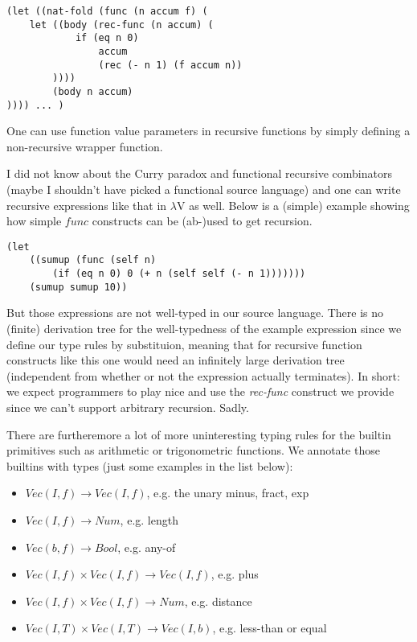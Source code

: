 \documentclass[letterpaper,12pt]{article}
\begin{document}
\begin{lstlisting}
(let ((nat-fold (func (n accum f) (
	let ((body (rec-func (n accum) (
			if (eq n 0)
				accum
				(rec (- n 1) (f accum n))
		))))
		(body n accum)
)))) ... )
\end{lstlisting}

One can use function value parameters in recursive functions
by simply defining a non-recursive wrapper function.

I did not know about the Curry paradox and functional
recursive combinators (maybe I shouldn't have picked a functional source language)
and one can write recursive expressions like that in $\lambda$V as well.
Below is a (simple) example showing how simple $func$ constructs can
be (ab-)used to get recursion.

\begin{lstlisting}
(let 
	((sumup (func (self n) 
		(if (eq n 0) 0 (+ n (self self (- n 1)))))))
	(sumup sumup 10))
\end{lstlisting}

But those expressions are not well-typed in our source language.
There is no (finite) derivation tree
for the well-typedness of the example expression since we define our
type rules by substituion, meaning that for recursive function constructs
like this one would need an infinitely large derivation tree (independent
from whether or not the expression actually terminates).
In short: we expect programmers to play nice and use the \textit{rec-func}
construct we provide since we can't support arbitrary recursion. Sadly.

\medskip
There are furtheremore a lot of more uninteresting typing rules for
the builtin primitives such as arithmetic or trigonometric functions.
We annotate those builtins with types (just some examples in the list below):

\begin{itemize}
	\item $Vec(I,f) \rightarrow Vec(I,f)$, e.g. the unary minus, fract, exp
	\item $Vec(I,f) \rightarrow Num$, e.g. length
	\item $Vec(b,f) \rightarrow Bool$, e.g. any-of
	\item $Vec(I,f) \times Vec(I,f) \rightarrow Vec(I,f)$, e.g. plus
	\item $Vec(I,f) \times Vec(I,f) \rightarrow Num$, e.g. distance
	\item $Vec(I,T) \times Vec(I,T) \rightarrow Vec(I,b)$, e.g. less-than or equal
\end{itemize}
\end{document}
